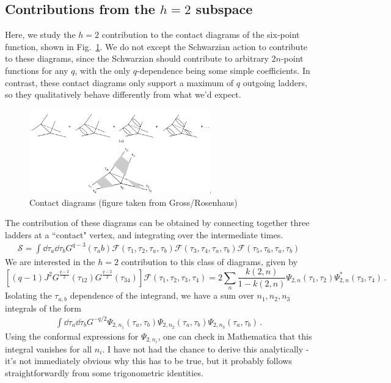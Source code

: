 \documentclass[aps,prx,preprint,onecolumn,citeautoscript,footinbib]{revtex4-1}
\begin{document}
\subsection{Contributions from the $h=2$ subspace}
Here, we study the $h=2$ contribution to the contact diagrams of the six-point function, shown in Fig.~\ref{fig:contact}. We do not except the Schwarzian action to contribute to these diagrams, since the Schwarzian should contribute to arbitrary $2n$-point functions for any $q$, with the only $q$-dependence being some simple coefficients. In contrast, these contact diagrams only support a maximum of $q$ outgoing ladders, so they qualitatively behave differently from what we'd expect.
\begin{figure}
    \centering
    \includegraphics[width=0.7\textwidth]{contact.png}
    \caption{Contact diagrams (figure taken from Gross/Rosenhaus)}
    \label{fig:contact}
\end{figure}
The contribution of these diagrams can be obtained by connecting together three ladders at a ``contact" vertex, and integrating over the intermediate times. 
\begin{equation}
    \begin{aligned}
        \mathcal{S} = \int \dd{\tau_a} \dd{\tau_b} G^{q-3}(\tau_ab) \mathcal{F}(\tau_1, \tau_2, \tau_a, \tau_b)\mathcal{F}(\tau_3, \tau_4, \tau_a, \tau_b)\mathcal{F}(\tau_5, \tau_6, \tau_a, \tau_b)
    \end{aligned}
\end{equation}
We are interested in the $h=2$ contribution to this class of diagrams, given by
\begin{equation}
 \left[(q-1) J^2 G^{\frac{q-2}{2}}(\tau_{12})  G^{\frac{q-2}{2}}(\tau_{34})\right] \mathcal{F}(\tau_1, \tau_2, \tau_3, \tau_4) = 2 \sum_n \frac{k(2, n)}{1-k(2, n)} \Psi_{2, n}(\tau_1, \tau_2) \Psi_{2, n}^*(\tau_3, \tau_4)\,.
 \label{eq:softModeFourPoint}
\end{equation}
Isolating the $\tau_{a,b}$ dependence of the integrand, we have a sum over $n_1, n_2, n_3$ integrals of the form
\begin{equation}
    \begin{aligned}
         \int \dd{\tau_a} \dd{\tau_b} G^{-q/2} \Psi_{2, n_1}(\tau_a, \tau_b) \Psi_{2, n_2}(\tau_a, \tau_b) \Psi_{2, n_3}(\tau_a, \tau_b)\,.
         \label{eq:contactIntegral}
    \end{aligned}
\end{equation}
Using the conformal expressions for $\Psi_{2, n_i}$, one can check in Mathematica that this integral vanishes for all $n_i$. I have not had the chance to derive this analytically - it's not immediately obvious why this has to be true, but it probably follows straightforwardly from some trigonometric identities. 
\end{document}
